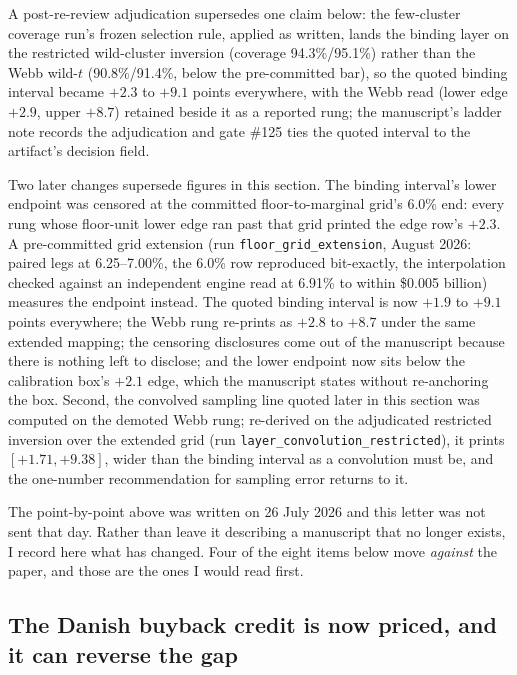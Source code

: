 \documentclass[11pt]{article}
\begin{document}
A post-re-review adjudication supersedes one claim below: the few-cluster coverage run's frozen selection rule, applied as written, lands the binding layer on the restricted wild-cluster inversion (coverage 94.3\%/95.1\%) rather than the Webb wild-$t$ (90.8\%/91.4\%, below the pre-committed bar), so the quoted binding interval became $+2.3$ to $+9.1$ points everywhere, with the Webb read (lower edge $+2.9$, upper $+8.7$) retained beside it as a reported rung; the manuscript's ladder note records the adjudication and gate \#125 ties the quoted interval to the artifact's decision field.

Two later changes supersede figures in this section. The binding interval's lower endpoint was censored at the committed floor-to-marginal grid's 6.0\% end: every rung whose floor-unit lower edge ran past that grid printed the edge row's $+2.3$. A pre-committed grid extension (run \texttt{floor\_grid\_extension}, August 2026: paired legs at 6.25--7.00\%, the 6.0\% row reproduced bit-exactly, the interpolation checked against an independent engine read at 6.91\% to within \$0.005 billion) measures the endpoint instead. The quoted binding interval is now $+1.9$ to $+9.1$ points everywhere; the Webb rung re-prints as $+2.8$ to $+8.7$ under the same extended mapping; the censoring disclosures come out of the manuscript because there is nothing left to disclose; and the lower endpoint now sits below the calibration box's $+2.1$ edge, which the manuscript states without re-anchoring the box. Second, the convolved sampling line quoted later in this section was computed on the demoted Webb rung; re-derived on the adjudicated restricted inversion over the extended grid (run \texttt{layer\_convolution\_restricted}), it prints $[+1.71, +9.38]$, wider than the binding interval as a convolution must be, and the one-number recommendation for sampling error returns to it.


The point-by-point above was written on 26 July 2026 and this letter was not sent
that day. Rather than leave it describing a manuscript that no longer exists, I
record here what has changed. Four of the eight items below move \emph{against} the
paper, and those are the ones I would read first.

\subsection{The Danish buyback credit is now priced, and it can reverse the gap}
\end{document}

